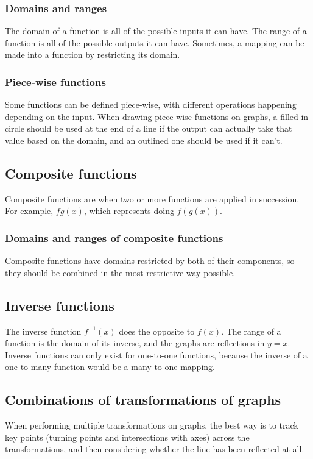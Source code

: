 \subsubsection{Domains and ranges}
The domain of a function is all of the possible inputs it can have. The range of a function is all of the possible outputs it can have. Sometimes, a mapping can be made into a function by restricting its domain.

\subsubsection{Piece-wise functions}
Some functions can be defined piece-wise, with different operations happening depending on the input. When drawing piece-wise functions on graphs, a filled-in circle should be used at the end of a line if the output can actually take that value based on the domain, and an outlined one should be used if it can't.

\subsection{Composite functions}
Composite functions are when two or more functions are applied in succession. For example, $fg(x)$, which represents doing $f(g(x))$.

\subsubsection{Domains and ranges of composite functions}
Composite functions have domains restricted by both of their components, so they should be combined in the most restrictive way possible.

\subsection{Inverse functions}
The inverse function $f^{-1}(x)$ does the opposite to $f(x)$. The range of a function is the domain of its inverse, and the graphs are reflections in $y=x$. Inverse functions can only exist for one-to-one functions, because the inverse of a one-to-many function would be a many-to-one mapping.

\subsection{Combinations of transformations of graphs}
When performing multiple transformations on graphs, the best way is to track key points (turning points and intersections with axes) across the transformations, and then considering whether the line has been reflected at all.


